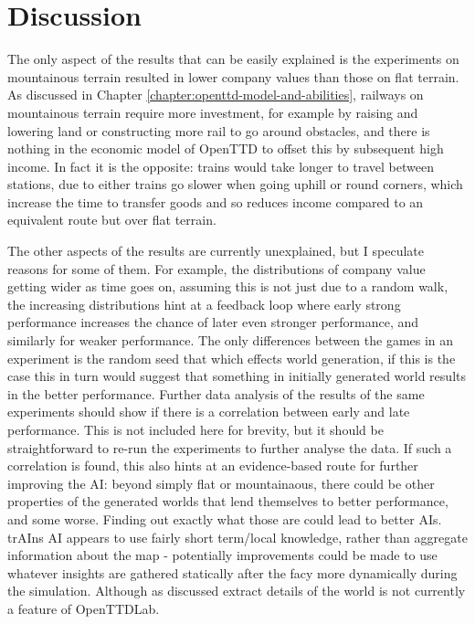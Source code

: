 \documentclass[logo,msc,dsti]{style/infthesis}    %
\begin{document}
{\section{Discussion}

The only aspect of the results that can be easily explained is the experiments on mountainous terrain resulted in lower company values than those on flat terrain. As discussed in Chapter \ref{chapter:openttd-model-and-abilities}, railways on mountainous terrain require more investment, for example by raising and lowering land or constructing more rail to go around obstacles, and there is nothing in the economic model of OpenTTD to offset this by subsequent high income. In fact it is the opposite: trains would take longer to travel between stations, due to either trains go slower when going uphill or round corners, which increase the time to transfer goods and so reduces income compared to an equivalent route but over flat terrain.

The other aspects of the results are currently unexplained, but I speculate reasons for some of them. For example, the distributions of company value getting wider as time goes on, assuming this is not just due to a random walk, the increasing distributions hint at a feedback loop where early strong performance increases the chance of later even stronger performance, and similarly for weaker performance. The only differences between the games in an experiment is the random seed that which effects world generation, if this is the case this in turn would suggest that something in initially generated world results in the better performance. Further data analysis of the results of the same experiments should show if there is a correlation between early and late performance. This is not included here for brevity, but it should be straightforward to re-run the experiments to further analyse the data. If such a correlation is found, this also hints at an evidence-based route for further improving the AI: beyond simply flat or mountainaous, there could be other properties of the generated worlds that lend themselves to better performance, and some worse. Finding out exactly what those are could lead to better AIs. trAIns AI appears to use fairly short term/local knowledge, rather than aggregate information about the map - potentially improvements could be made to use whatever insights are gathered statically after the facy more dynamically during the simulation. Although as discussed extract details of the world is not currently a feature of OpenTTDLab.

}
\end{document}
